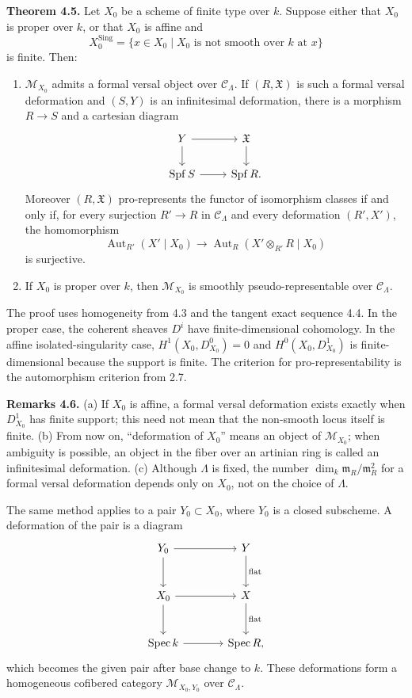 \documentclass[11pt]{article}
\providecommand{\Spec}{\operatorname{Spec}}
\providecommand{\Aut}{\operatorname{Aut}}
\providecommand{\Spf}{\operatorname{Spf}}
\begin{document}
\textbf{Theorem 4.5.} Let \(X_0\) be a scheme of finite type over \(k\). Suppose either that \(X_0\) is proper over \(k\), or that \(X_0\) is affine and
\[
 X_0^{\mathrm{Sing}}=\{x\in X_0\mid X_0\text{ is not smooth over }k\text{ at }x\}
\]
is finite. Then:
\begin{enumerate}[label=(\alph*)]
\item \(\mathcal M_{X_0}\) admits a formal versal object over \(\mathcal C_\Lambda\). If \((R,\mathfrak X)\) is such a formal versal deformation and \((S,Y)\) is an infinitesimal deformation, there is a morphism \(R\to S\) and a cartesian diagram
\[
\begin{tikzcd}
 Y \arrow[r] \arrow[d] & \mathfrak X \arrow[d]\\
 \Spf S \arrow[r] & \Spf R.
\end{tikzcd}
\]
Moreover \((R,\mathfrak X)\) pro-represents the functor of isomorphism classes if and only if, for every surjection \(R'\to R\) in \(\mathcal C_\Lambda\) and every deformation \((R',X')\), the homomorphism
\[
 \Aut_{R'}(X'\mid X_0)\to \Aut_R(X'\otimes_{R'}R\mid X_0)
\]
is surjective.
\item If \(X_0\) is proper over \(k\), then \(\mathcal M_{X_0}\) is smoothly pseudo-representable over \(\mathcal C_\Lambda\).
\end{enumerate}
The proof uses homogeneity from 4.3 and the tangent exact sequence 4.4. In the proper case, the coherent sheaves \(D^i\) have finite-dimensional cohomology. In the affine isolated-singularity case, \(H^1(X_0,D^0_{X_0})=0\) and \(H^0(X_0,D^1_{X_0})\) is finite-dimensional because the support is finite. The criterion for pro-representability is the automorphism criterion from 2.7.

\textbf{Remarks 4.6.} (a) If \(X_0\) is affine, a formal versal deformation exists exactly when \(D^1_{X_0}\) has finite support; this need not mean that the non-smooth locus itself is finite. (b) From now on, ``deformation of \(X_0\)'' means an object of \(\mathcal M_{X_0}\); when ambiguity is possible, an object in the fiber over an artinian ring is called an infinitesimal deformation. (c) Although \(\Lambda\) is fixed, the number \(\dim_k \mathfrak m_R/\mathfrak m_R^2\) for a formal versal deformation depends only on \(X_0\), not on the choice of \(\Lambda\).

The same method applies to a pair \(Y_0\subset X_0\), where \(Y_0\) is a closed subscheme. A deformation of the pair is a diagram
\[
\begin{tikzcd}[column sep=large,row sep=large]
 Y_0 \arrow[r] \arrow[d] & Y \arrow[d,"\mathrm{flat}"]\\
 X_0 \arrow[r] \arrow[d] & X \arrow[d,"\mathrm{flat}"]\\
 \Spec k \arrow[r] & \Spec R,
\end{tikzcd}
\]
which becomes the given pair after base change to \(k\). These deformations form a homogeneous cofibered category \(\mathcal M_{X_0,Y_0}\) over \(\mathcal C_\Lambda\).
\end{document}
